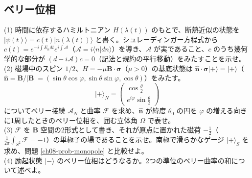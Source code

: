 \subsection{ベリー位相}

\begin{problem}[難易度 B]\label{ch08-prob-berry}
(1) 時間に依存するハミルトニアン $H(\lambda(t))$ のもとで、断熱近似の状態を $\lvert\psi(t)\rangle=c(t)\lvert n(\lambda(t))\rangle$ と書く。シュレーディンガー方程式から $c(t)=e^{-i\int E_n dt}e^{i\int\mathcal A}$（$\mathcal A=i\langle n|dn\rangle$）を導き、$\mathcal A$ が実であること、$c$ のうち幾何学的な部分が $(d-i\mathcal A)c=0$（記法と規約の平行移動）をみたすことを示せ。\\
(2) 磁場中のスピン $1/2$、$H=-\mu\bm B\cdot\bm\sigma$（$\mu>0$）の基底状態は $\hat{\bm n}\cdot\bm\sigma\lvert+\rangle=\lvert+\rangle$（$\hat{\bm n}=\bm B/\lvert\bm B\rvert=(\sin\theta\cos\varphi,\sin\theta\sin\varphi,\cos\theta)$）をみたす。
\[
\lvert+\rangle_N=\begin{pmatrix}\cos\frac\theta2\\ e^{i\varphi}\sin\frac\theta2\end{pmatrix}
\]
についてベリー接続 $\mathcal A_N$ と曲率 $\mathcal F$ を求め、$\hat{\bm n}$ が緯度 $\theta_0$ の円を $\varphi$ の増える向きに1周したときのベリー位相を、囲む立体角 $\Omega$ で表せ。\\
(3) $\mathcal F$ を $\bm B$ 空間の2形式として書き、それが原点に置かれた磁荷 $-\frac12$（$\frac1{2\pi}\int_{S^2}\mathcal F=-1$）の単極子の場であることを示せ。南極で滑らかなゲージ $\lvert+\rangle_S$ を求め、問題 \ref{ch08-prob-monopole} と比較せよ。\\
(4) 励起状態 $\lvert-\rangle$ のベリー位相はどうなるか。2つの準位のベリー曲率の和について述べよ。
\end{problem}

